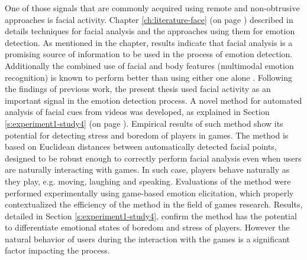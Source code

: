 One of those signals that are commonly acquired using remote and non-obtrusive approaches is facial activity. Chapter \ref{ch:literature-face} (on page \pageref{ch:literature-face}) described in details techniques for facial analysis and the approaches using them for emotion detection. As mentioned in the chapter, results indicate that facial analysis is a promising source of information to be used in the process of emotion detection. Additionally  the combined use of facial and body features (multimodal emotion recognition) is known to perform better than using either one alone \parencite{zacharatos2014automatic}. Following the findings of previous work, the present thesis used facial activity as an important signal in the emotion detection process. A novel method for automated analysis of facial cues from videos was developed, as explained in Section \ref{s:experiment1-study4} (on page \pageref{s:experiment1-study4}). Empirical results of such method show its potential for detecting stress and boredom of players in games. The method is based on Euclidean distances between automatically detected facial points, designed to be robust enough to correctly perform facial analysis even when users are naturally interacting with games. In such case, players behave naturally as they play, e.g. moving, laughing and speaking. Evaluations of the method were performed experimentally using game-based emotion elicitation, which properly contextualized the efficiency of the method in the field of games research. Results, detailed in Section \ref{s:experiment1-study4}, confirm the method has the potential to differentiate emotional states of boredom and stress of players. However the natural behavior of users during the interaction with the games is a significant factor impacting the process.


